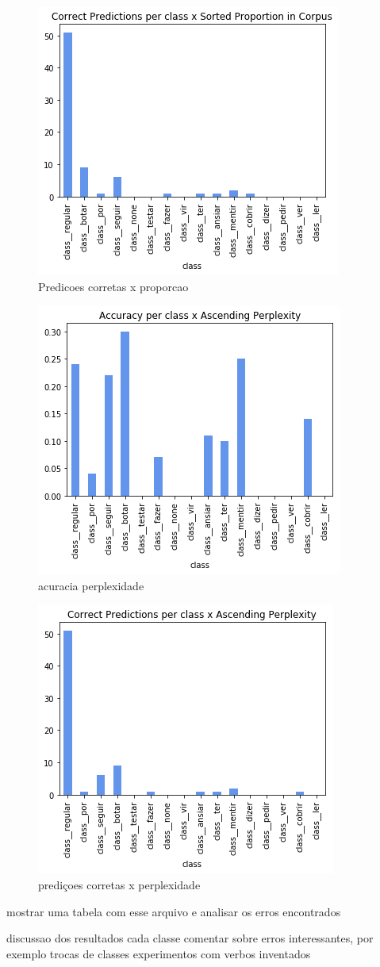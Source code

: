 \begin{figure}[H]
  \centering
  \includegraphics[width=0.7\linewidth]{img/best_file_correct_p.png}
  \caption{Predicoes corretas x proporcao}
  \label{fig:predicxprop}
\end{figure}

\begin{figure}[H]
  \centering
  \includegraphics[width=0.7\linewidth]{img/best_file_acuracy_perplexity.png}
  \caption{acuracia perplexidade}
  \label{fig:acuper}
\end{figure}

\begin{figure}[H]
  \centering
  \includegraphics[width=0.7\linewidth]{img/best_file_accuracy_perplexity.png}
  \caption{prediçoes corretas x perplexidade}
  \label{fig:prexper}
\end{figure}


mostrar uma tabela com esse arquivo e analisar os erros encontrados

discussao dos resultados
cada classe
comentar sobre erros interessantes, por exemplo trocas de classes
experimentos com verbos inventados
